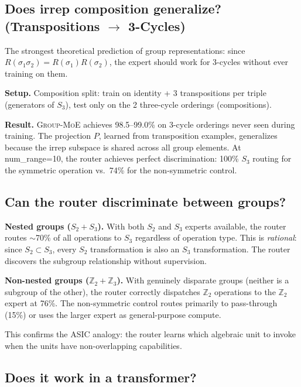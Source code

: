 \documentclass[10pt, letterpaper]{article}
\newcommand{\gmoe}{\textsc{Group-MoE}}
\begin{document}
\subsection{Does irrep composition generalize? (Transpositions $\to$ 3-Cycles)}
\label{sec:exp-composition}

The strongest theoretical prediction of group representations: since $R(\sigma_1 \sigma_2) = R(\sigma_1) R(\sigma_2)$, the expert should work for 3-cycles without ever training on them.

\textbf{Setup.} Composition split: train on identity + 3 transpositions per triple (generators of $S_3$), test only on the 2 three-cycle orderings (compositions).

\textbf{Result.} \gmoe{} achieves 98.5--99.0\% on 3-cycle orderings never seen during training. The projection $P$, learned from transposition examples, generalizes because the irrep subspace is shared across all group elements. At num\_range=10, the router achieves perfect discrimination: 100\% $S_3$ routing for the symmetric operation vs.\ 74\% for the non-symmetric control.

\subsection{Can the router discriminate between groups?}
\label{sec:exp-multigroup}

\textbf{Nested groups ($S_2 + S_3$).} With both $S_2$ and $S_3$ experts available, the router routes $\sim$70\% of all operations to $S_3$ regardless of operation type. This is \emph{rational}: since $S_2 \subset S_3$, every $S_2$ transformation is also an $S_3$ transformation. The router discovers the subgroup relationship without supervision.

\textbf{Non-nested groups ($\mathbb{Z}_2 + \mathbb{Z}_3$).} With genuinely disparate groups (neither is a subgroup of the other), the router correctly dispatches $\mathbb{Z}_2$ operations to the $\mathbb{Z}_2$ expert at 76\%. The non-symmetric control routes primarily to pass-through (15\%) or uses the larger expert as general-purpose compute.

This confirms the ASIC analogy: the router learns which algebraic unit to invoke when the units have non-overlapping capabilities.

\subsection{Does it work in a transformer?}
\label{sec:exp-transformer}
\end{document}
